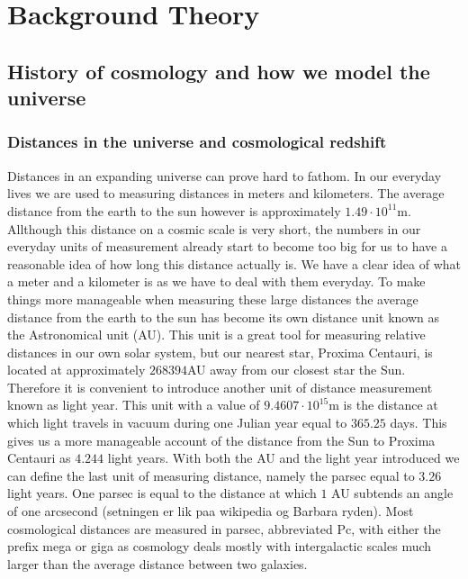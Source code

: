 \chapter{Background Theory}
\section{History of cosmology and how we model the universe}
\subsection{Distances in the universe and cosmological redshift}
Distances in an expanding universe can prove hard to fathom. In our everyday
lives we are used to measuring distances in meters and kilometers. The
average distance from the earth to the sun however is approximately $1.49\cdot10^{11}$m.
Allthough this distance on a cosmic scale is very short, the numbers in our
everyday units of measurement already start to become too big for us to have a
reasonable idea of how long this distance actually is. We have a clear idea of
what a meter and a kilometer is as we have to deal with them everyday. To make
things more manageable when measuring these large distances the average distance
from the earth to the sun has become its own distance unit known as the
Astronomical unit (AU). This unit is a great tool for measuring relative
distances in our own solar system, but our nearest star, Proxima Centauri, is
located at approximately $268394$AU away from our closest star the Sun.
Therefore it is convenient to introduce another unit of distance measurement known as light year. This unit with a value of $9.4607\cdot10^{15}$m is the distance at
which light travels in vacuum during one Julian year equal to $365.25$ days.
This gives us a more manageable account of the distance from the Sun to Proxima
Centauri as $4.244$ light years. With both the AU and the light year introduced
we can define the last unit of measuring distance, namely the parsec equal to $3.26$
light years. One parsec is equal to the distance at which $1$ AU subtends an angle
of one arcsecond (setningen er lik paa wikipedia og Barbara ryden). Most
cosmological distances are measured in parsec, abbreviated Pc, with either the
prefix mega or giga as cosmology deals mostly with intergalactic scales much
larger than the average distance between two galaxies.\\

